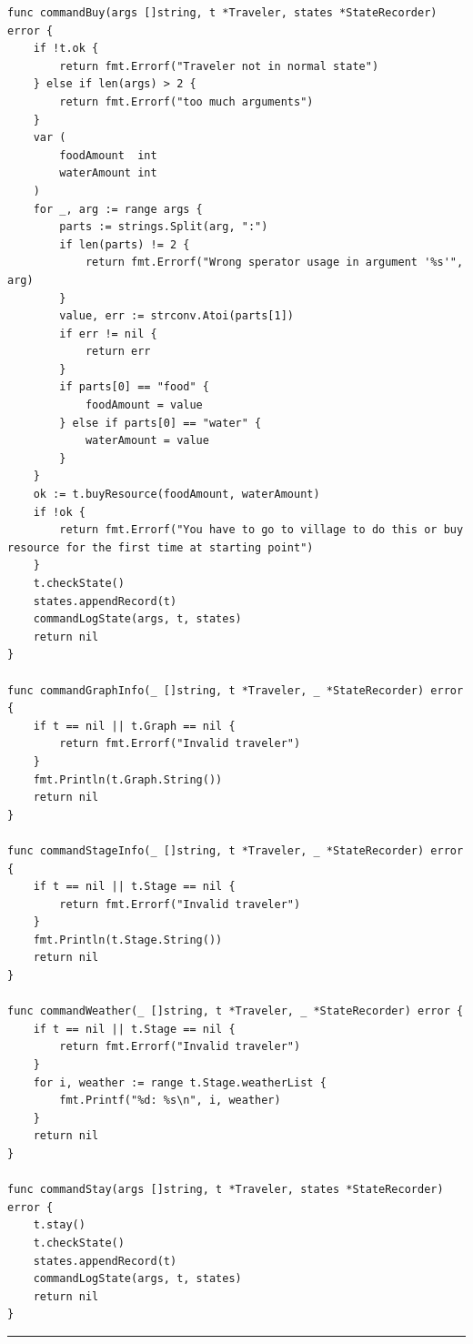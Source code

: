 \documentclass[a4paper]{ctexart}
\begin{document}
\begin{verbatim}
func commandBuy(args []string, t *Traveler, states *StateRecorder) error {
    if !t.ok {
        return fmt.Errorf("Traveler not in normal state")
    } else if len(args) > 2 {
        return fmt.Errorf("too much arguments")
    }
    var (
        foodAmount  int
        waterAmount int
    )
    for _, arg := range args {
        parts := strings.Split(arg, ":")
        if len(parts) != 2 {
            return fmt.Errorf("Wrong sperator usage in argument '%s'", arg)
        }
        value, err := strconv.Atoi(parts[1])
        if err != nil {
            return err
        }
        if parts[0] == "food" {
            foodAmount = value
        } else if parts[0] == "water" {
            waterAmount = value
        }
    }
    ok := t.buyResource(foodAmount, waterAmount)
    if !ok {
        return fmt.Errorf("You have to go to village to do this or buy resource for the first time at starting point")
    }
    t.checkState()
    states.appendRecord(t)
    commandLogState(args, t, states)
    return nil
}

func commandGraphInfo(_ []string, t *Traveler, _ *StateRecorder) error {
    if t == nil || t.Graph == nil {
        return fmt.Errorf("Invalid traveler")
    }
    fmt.Println(t.Graph.String())
    return nil
}

func commandStageInfo(_ []string, t *Traveler, _ *StateRecorder) error {
    if t == nil || t.Stage == nil {
        return fmt.Errorf("Invalid traveler")
    }
    fmt.Println(t.Stage.String())
    return nil
}

func commandWeather(_ []string, t *Traveler, _ *StateRecorder) error {
    if t == nil || t.Stage == nil {
        return fmt.Errorf("Invalid traveler")
    }
    for i, weather := range t.Stage.weatherList {
        fmt.Printf("%d: %s\n", i, weather)
    }
    return nil
}

func commandStay(args []string, t *Traveler, states *StateRecorder) error {
    t.stay()
    t.checkState()
    states.appendRecord(t)
    commandLogState(args, t, states)
    return nil
}

\end{verbatim}

\hrule
\end{document}
